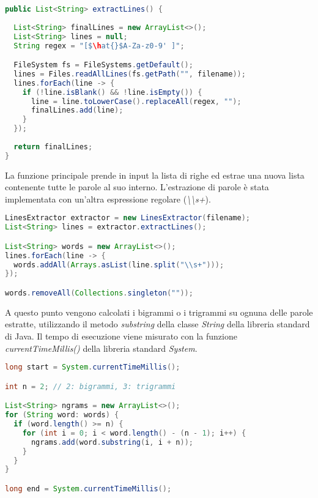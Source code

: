 \documentclass[10pt,twocolumn,letterpaper]{article}
\begin{document}
\begin{lstlisting}[basicstyle=\scriptsize, language=Java, frame=single, caption={Esempio di estrazione di righe da un file in Java},captionpos=b, showstringspaces=false, mathescape=true]
public List<String> extractLines() {
  
  List<String> finalLines = new ArrayList<>();
  List<String> lines = null;
  String regex = "[$\hat{}$A-Za-z0-9' ]";

  FileSystem fs = FileSystems.getDefault();
  lines = Files.readAllLines(fs.getPath("", filename));
  lines.forEach(line -> {
    if (!line.isBlank() && !line.isEmpty()) {
      line = line.toLowerCase().replaceAll(regex, "");
      finalLines.add(line);
    }
  });
  
  return finalLines;
}  
\end{lstlisting}

La funzione principale prende in input la lista di righe ed estrae una nuova lista contenente tutte le parole al suo interno. L'estrazione di parole è stata implementata con un'altra espressione regolare (\textit{\textbackslash \textbackslash s+}). \newline

\begin{lstlisting}[basicstyle=\scriptsize, language=Java, frame=single, caption={Esempio di estrazione di parole in Java},captionpos=b, showstringspaces=false]
LinesExtractor extractor = new LinesExtractor(filename);
List<String> lines = extractor.extractLines();

List<String> words = new ArrayList<>();
lines.forEach(line -> {
  words.addAll(Arrays.asList(line.split("\\s+")));
});

words.removeAll(Collections.singleton(""));
\end{lstlisting}

A questo punto vengono calcolati i bigrammi o i trigrammi su ognuna delle parole estratte, utilizzando il metodo \textit{substring} della classe \textit{String} della libreria standard di Java. Il tempo di esecuzione viene misurato con la funzione \textit{currentTimeMillis()} della libreria standard \textit{System}.\newline

\begin{lstlisting}[basicstyle=\scriptsize, language=Java, frame=single, caption={Esempio di ricerca di bigrammi/trigrammi in Java},captionpos=b, showstringspaces=false]
long start = System.currentTimeMillis();

int n = 2; // 2: bigrammi, 3: trigrammi

List<String> ngrams = new ArrayList<>();
for (String word: words) {
  if (word.length() >= n) {
    for (int i = 0; i < word.length() - (n - 1); i++) {
      ngrams.add(word.substring(i, i + n));
    }
  }
}

long end = System.currentTimeMillis();
\end{lstlisting}
\end{document}
